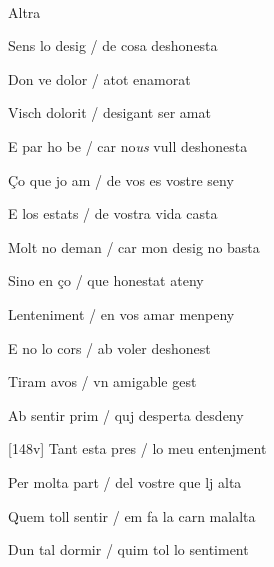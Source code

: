 \documentclass[12pt]{article}
\renewcommand{\espaiAbansEtiquetaPoema}{\vspace{0ex}}
\begin{document}
\begin{estrofa}

\espaiAbansEtiquetaPoema

\\

\begin{rubrica}

Altra

\end{rubrica}

\end{estrofa}


\begin{estrofa}

 Sens lo desig / de cosa deshonesta

 Don ve dolor / atot enamorat

 Visch dolorit / desigant ser amat

 E par ho be / car no\textit{us} vull deshonesta

 \c{C}o que jo am / de vos es vostre seny

 E los estats / de vostra vida casta

 Molt no deman / car mon desig no basta

 Sino en \c{c}o / que honestat ateny

\end{estrofa}



\begin{estrofa}

 Lenteniment / en vos amar menpeny

 E no lo cors / ab voler deshonest

 Tiram avos / vn amigable gest

 Ab sentir prim / quj desperta desdeny

 [148v] Tant esta pres / lo meu entenjment

 Per molta part / del vostre que lj alta

 Quem toll sentir / em fa la carn malalta

 Dun tal dormir / quim tol lo sentiment

\end{estrofa}
\end{document}
